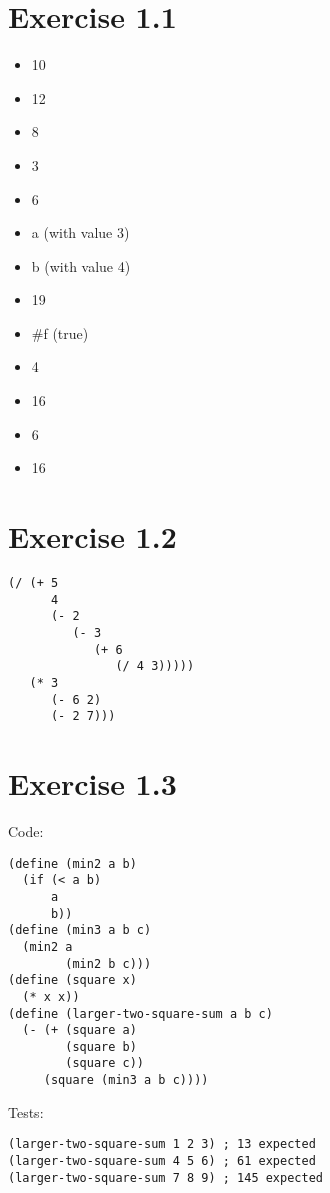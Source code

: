 \documentclass[../main.tex]{subfiles}
\begin{document}
\section{Exercise 1.1}

\begin{multicols}{2}
  \begin{itemize}
    \item 10
    \item 12
    \item 8
    \item 3
    \item 6
    \item a (with value 3)
    \item b (with value 4)
    \item 19
    \item \#f (true)
    \item 4
    \item 16
    \item 6
    \item 16
  \end{itemize}
\end{multicols}

\section{Exercise 1.2}

\begin{lstlisting}
(/ (+ 5
      4
      (- 2
         (- 3
            (+ 6
               (/ 4 3)))))
   (* 3
      (- 6 2)
      (- 2 7)))
\end{lstlisting}

\section{Exercise 1.3}

Code:

\begin{lstlisting}
(define (min2 a b)
  (if (< a b)
      a
      b))
(define (min3 a b c)
  (min2 a
        (min2 b c)))
(define (square x)
  (* x x))
(define (larger-two-square-sum a b c)
  (- (+ (square a)
        (square b)
        (square c))
     (square (min3 a b c))))
\end{lstlisting}

Tests:

\begin{lstlisting}
(larger-two-square-sum 1 2 3) ; 13 expected
(larger-two-square-sum 4 5 6) ; 61 expected
(larger-two-square-sum 7 8 9) ; 145 expected
\end{lstlisting}
\end{document}
